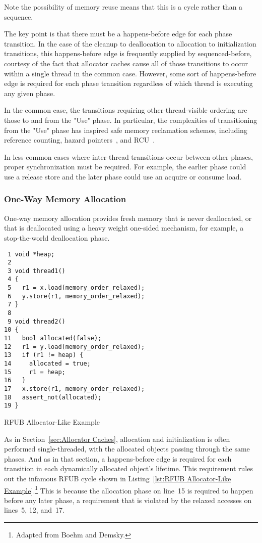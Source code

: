 \documentclass[10]{article}
\begin{document}
Note the possibility of memory reuse means that this is a cycle rather
than a sequence.

The key point is that there must be a happens-before edge for each
phase transition.
In the case of the cleanup to deallocation to allocation to initialization
transitions, this happens-before edge is frequently supplied by
sequenced-before, courtesy of the fact that allocator caches cause
all of those transitions to occur within a single thread in the common
case.
However, some sort of happens-before edge is required for each phase
transition regardless of which thread is executing any given phase.

In the common case, the transitions requiring other-thread-visible ordering
are those to and from the "Use" phase.
In particular, the complexities of transitioning from the "Use" phase
has inspired safe memory reclamation schemes, including
reference counting,
hazard pointers~\cite{Michael02a,HerlihyLM02,MagedMichael04a},
and RCU~\cite{McKenney98}.

In less-common cases where inter-thread transitions occur between other
phases, proper synchronization must be required.
For example, the earlier phase could use a release store and
the later phase could use an acquire or consume load.

\subsubsection{One-Way Memory Allocation}
\label{sec:One-Way Memory Allocation}

One-way memory allocation provides fresh memory that is never deallocated,
or that is deallocated using a heavy weight one-sided mechanism, for
example, a stop-the-world deallocation phase.

\begin{listing}[tbp]
\begin{verbatim}
 1 void *heap;
 2
 3 void thread1()
 4 {
 5   r1 = x.load(memory_order_relaxed);
 6   y.store(r1, memory_order_relaxed);
 7 }
 8
 9 void thread2()
10 {
11   bool allocated(false);
12   r1 = y.load(memory_order_relaxed);
13   if (r1 != heap) {
14     allocated = true;
15     r1 = heap;
16   }
17   x.store(r1, memory_order_relaxed);
18   assert_not(allocated);
19 }
\end{verbatim}
\caption{RFUB Allocator-Like Example}
\label{lst:RFUB Allocator-Like Example}
\end{listing}

As in
Section~\ref{sec:Allocator Caches},
allocation and initialization is often performed single-threaded,
with the allocated objects passing through the same phases.
And as in that section, a happens-before edge is required for each
transition in each dynamically allocated object's lifetime.
This requirement rules out the infamous RFUB cycle shown in
Listing~\ref{lst:RFUB Allocator-Like Example}.\footnote{
	Adapted from Boehm and
	Demsky\cite[Figure 5]{Boehm:2014:OGA:2618128.2618134}.}
This is because the allocation phase on line~15 is required to happen
before any later phase, a requirement that is violated by the relaxed
accesses on lines~5, 12, and~17.
\end{document}
